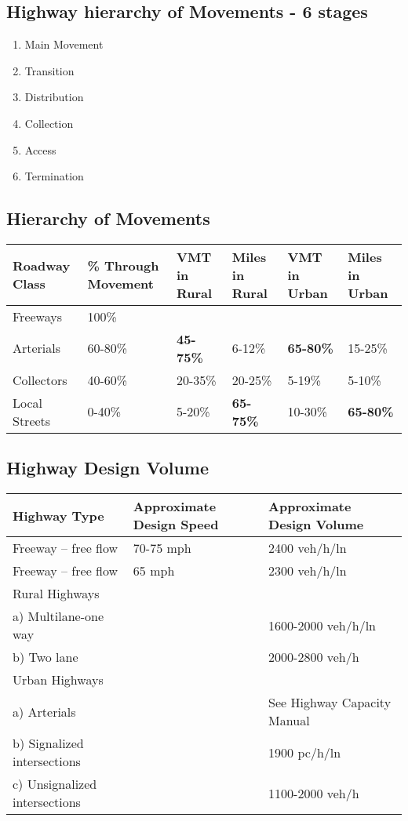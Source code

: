 \documentclass{article}
\begin{document}
  \subsection{Highway hierarchy of Movements - 6 stages}
  \begin{enumerate}
    \item Main Movement
    \item Transition
    \item Distribution
    \item Collection 
    \item Access
    \item Termination
  \end{enumerate}

  \subsection{Hierarchy of Movements}
	\begin{tabular}{|l|p{2cm}|p{2cm}|p{2cm}|p{2cm}|p{2cm}|}
	\hline
	\textbf{Roadway Class} & \textbf{\% Through Movement} & \textbf{VMT in Rural} & \textbf{Miles in Rural} & \textbf{VMT in Urban} & \textbf{Miles in Urban} \\
	\hline
	Freeways      & 100\%     &     &  \\
	Arterials     & 60-80\%   & {\bfseries 45-75\%} & 6-12\%  & {\bfseries 65-80\%}   & 15-25\% \\
	Collectors    & 40-60\%   & 20-35\% & 20-25\% & 5-19\%    & 5-10\% \\
	Local Streets & 0-40\%    & 5-20\%  & {\bfseries 65-75\%} & 10-30\%   & {\bfseries 65-80\%} \\
	\hline
	\end{tabular}

  \subsection{Highway Design Volume}
  \begin{tabular}{|l|l|l|}
  \hline
  Highway Type & Approximate Design Speed & Approximate Design Volume \\
  \hline
  Freeway – free flow & 70-75 mph & 2400 veh/h/ln \\
  Freeway – free flow & 65 mph & 2300 veh/h/ln \\
  \hline
  Rural Highways & & \\
  a) Multilane-one way & & 1600-2000 veh/h/ln \\
  b) Two lane & & 2000-2800 veh/h \\
  \hline
  Urban Highways & & \\
  a) Arterials & & See Highway Capacity Manual \\
  b) Signalized intersections & & 1900 pc/h/ln \\
  c) Unsignalized intersections & & 1100-2000 veh/h \\
  \hline
  \end{tabular}
\end{document}
